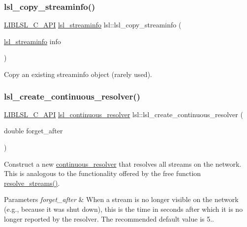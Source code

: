 \subsubsection{\texorpdfstring{lsl\+\_\+copy\+\_\+streaminfo()}{lsl\_copy\_streaminfo()}}
{\footnotesize\ttfamily \hyperlink{lsl__cpp_8h_aafd0ef1813e8be84a1420c4f1df64615}{L\+I\+B\+L\+S\+L\+\_\+\+C\+\_\+\+A\+PI} \hyperlink{namespacelsl_aa0a9ce9956061679949daa2e35aae2e8}{lsl\+\_\+streaminfo} lsl\+::lsl\+\_\+copy\+\_\+streaminfo (\begin{DoxyParamCaption}\item[{\hyperlink{namespacelsl_aa0a9ce9956061679949daa2e35aae2e8}{lsl\+\_\+streaminfo}}]{info }\end{DoxyParamCaption})}

Copy an existing streaminfo object (rarely used). \mbox{\label{namespacelsl_a8da66ce60f1720e808771e14337e4bdb}} 
\subsubsection{\texorpdfstring{lsl\+\_\+create\+\_\+continuous\+\_\+resolver()}{lsl\_create\_continuous\_resolver()}}
{\footnotesize\ttfamily \hyperlink{lsl__cpp_8h_aafd0ef1813e8be84a1420c4f1df64615}{L\+I\+B\+L\+S\+L\+\_\+\+C\+\_\+\+A\+PI} \hyperlink{namespacelsl_ab09ea0488f986f056322c3c866dc0a0f}{lsl\+\_\+continuous\+\_\+resolver} lsl\+::lsl\+\_\+create\+\_\+continuous\+\_\+resolver (\begin{DoxyParamCaption}\item[{double}]{forget\+\_\+after }\end{DoxyParamCaption})}

Construct a new \hyperlink{classlsl_1_1continuous__resolver}{continuous\+\_\+resolver} that resolves all streams on the network. This is analogous to the functionality offered by the free function \hyperlink{namespacelsl_a2935ff3db04cd640f69943ad14a61915}{resolve\+\_\+streams()}. 
\begin{DoxyParams}{Parameters}
{\em forget\+\_\+after} & When a stream is no longer visible on the network (e.\+g., because it was shut down), this is the time in seconds after which it is no longer reported by the resolver. The recommended default value is 5.. \\
\hline
\end{DoxyParams}
\mbox{\label{namespacelsl_a632a18d8a150be1ae72efac7074c476d}} 
